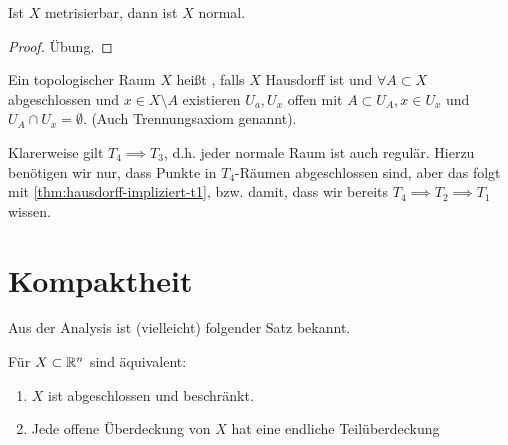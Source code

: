 \begin{theorem}\label{thm:metrischer-raum-ist-normal}
    Ist $X$ metrisierbar, dann ist  $X$ normal.
\end{theorem}

\begin{proof}
    Übung.
\end{proof}

\begin{definition}[Regulär]\label{def:regulär}
    Ein topologischer Raum $X$ heißt  , falls $X$ Hausdorff ist und  $\forall  A \subset X$ abgeschlossen und $x\in X \setminus A$ existieren $U_a, U_{x}$ offen mit $A\subset U_A, x\in U_x$ und $U_A \cap U_x = \emptyset$. (Auch Trennungsaxiom  genannt). \\
    \begin{minipage}{\textwidth}
        \centering
        \begin{minipage}{0.7\textwidth}
        \centering
        \end{minipage}
    \end{minipage}
\end{definition}

\begin{remark}
    Klarerweise gilt $T_4 \implies T_3$, d.h. jeder normale Raum ist auch regulär. Hierzu benötigen wir nur, dass Punkte in $T_4$-Räumen abgeschlossen sind, aber das folgt mit \autoref{thm:hausdorff-impliziert-t1}, bzw. damit, dass wir bereits $T_4 \implies T_2 \implies T_1$ wissen.
\end{remark}
\begin{figure}[ht]
    \centering
    \label{fig:regular-space}
\end{figure}


\section{Kompaktheit}
Aus der Analysis ist (vielleicht) folgender Satz bekannt.
\begin{theorem}\label{thm:heine-borel}
    Für $X\subset \mathbb{R}^n$ sind äquivalent:
    \begin{enumerate}[1)]
        \item $X$ ist abgeschlossen und beschränkt.
        \item Jede offene Überdeckung von $X$ hat eine endliche Teilüberdeckung
    \end{enumerate}
\end{theorem}

